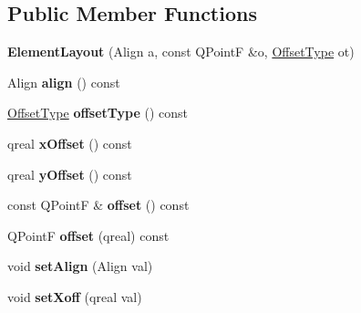\subsection*{Public Member Functions}
\begin{DoxyCompactItemize}
\item 
\mbox{\label{class_ms_1_1_element_layout_a3566165dd5b0d764a273ef3fac09b587}} 
{\bfseries Element\+Layout} (Align a, const Q\+PointF \&o, \hyperlink{namespace_ms_afe84fbdef0df9b3922d749984380e57a}{Offset\+Type} ot)
\item 
\mbox{\label{class_ms_1_1_element_layout_a79c731339f3e866ef4447471f3e23681}} 
Align {\bfseries align} () const
\item 
\mbox{\label{class_ms_1_1_element_layout_ac01747a873e3de122f52459b49508ad7}} 
\hyperlink{namespace_ms_afe84fbdef0df9b3922d749984380e57a}{Offset\+Type} {\bfseries offset\+Type} () const
\item 
\mbox{\label{class_ms_1_1_element_layout_a4906f033344f4d1f862caff8c6a94465}} 
qreal {\bfseries x\+Offset} () const
\item 
\mbox{\label{class_ms_1_1_element_layout_a8923d24ce40dc6cf4c1914cd8e6de477}} 
qreal {\bfseries y\+Offset} () const
\item 
\mbox{\label{class_ms_1_1_element_layout_acb57725fc7e7033784971c10be784c71}} 
const Q\+PointF \& {\bfseries offset} () const
\item 
\mbox{\label{class_ms_1_1_element_layout_ac72c655ed026308c168571bb8f167698}} 
Q\+PointF {\bfseries offset} (qreal) const
\item 
\mbox{\label{class_ms_1_1_element_layout_ab4cfac99ae65c2563ebead4d597e33c9}} 
void {\bfseries set\+Align} (Align val)
\item 
\mbox{\label{class_ms_1_1_element_layout_aaac91dcee39e9c51f6c498b2a27f2a2b}} 
void {\bfseries set\+Xoff} (qreal val)
\item 

\end{DoxyCompactItemize}
